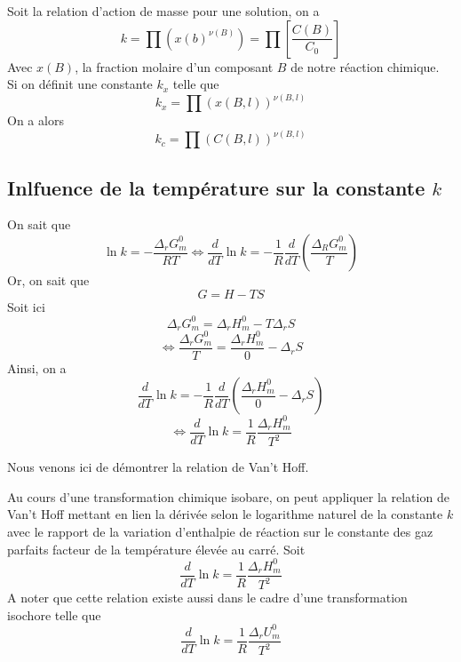 Soit la relation d'action de masse pour une solution, on a 
\begin{equation}
k = \prod \left ( x(b)^{\nu(B)} \right ) = \prod \left [ \frac{C(B)}{C_0}\right ]
\end{equation}
Avec $x(B)$, la fraction molaire d'un composant $B$ de notre réaction chimique.\\

Si on définit une constante $k_x$ telle que
\begin{equation}
k_x=\prod \left ( x(B,l)\right ) ^{\nu(B,l)}
\end{equation}
On a alors
\begin{equation}
k_c=\prod \left ( C(B,l) \right )^{\nu(B,l)}
\end{equation}

\subsection{Inlfuence de la température sur la constante $k$}

On sait que 
$$\ln k = -\frac{\Delta_rG_m^0}{RT} \Leftrightarrow \frac{d}{dT} \ln k = -\frac{1}{R} \frac{d}{dT} \left ( \frac{\Delta_RG_m^0}{T} \right )$$
Or, on sait que 
$$G=H-TS$$
Soit ici
$$\Delta_rG_m^0=\Delta_rH_m^0-T\Delta_rS$$
$$\Leftrightarrow \frac{\Delta_rG_m^0}{T}=\frac{\Delta_rH_m^0}{0}-\Delta_rS$$
Ainsi, on a
$$\frac{d}{dT} \ln k = -\frac{1}{R} \frac{d}{dT} \left ( \frac{\Delta_rH_m^0}{0}-\Delta_rS \right )$$
$$\Leftrightarrow \frac{d}{dT} \ln k = \frac{1}{R} \frac{\Delta_rH_m^0}{T^2}$$

Nous venons ici de démontrer la relation de Van't Hoff.

\begin{theorem}
Au cours d'une transformation chimique isobare, on peut appliquer la relation de Van't Hoff mettant en lien la dérivée selon le logarithme naturel de la constante $k$ avec le rapport de la variation d'enthalpie de réaction sur le constante des gaz parfaits facteur de la température élevée au carré. Soit
\begin{equation}
\frac{d}{dT} \ln k = \frac{1}{R} \frac{\Delta_rH_m^0}{T^2}
\end{equation}
A noter que cette relation existe aussi dans le cadre d'une transformation isochore telle que
\begin{equation}
\frac{d}{dT} \ln k = \frac{1}{R} \frac{\Delta_rU_m^0}{T^2}
\end{equation}
\end{theorem}

